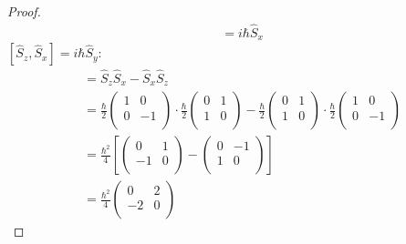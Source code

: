 \documentclass[../psets.tex]{subfiles}
\begin{document}
\begin{enumerate}
\begin{enumerate}
\begin{proof}
\begin{align*}
                &= i\hbar\hat{S}_x
            \end{align*}
            \underline{$[\hat{S}_z,\hat{S}_x]=i\hbar\hat{S}_y$}:
            \begin{align*}
                [\hat{S}_z,\hat{S}_x] &= \hat{S}_z\hat{S}_x-\hat{S}_x\hat{S}_z\\
                &= \frac{\hbar}{2}
                \begin{pmatrix}
                    1 & 0\\
                    0 & -1\\
                \end{pmatrix}
                \cdot\frac{\hbar}{2}
                \begin{pmatrix}
                    0 & 1\\
                    1 & 0\\
                \end{pmatrix}
                -\frac{\hbar}{2}
                \begin{pmatrix}
                    0 & 1\\
                    1 & 0\\
                \end{pmatrix}
                \cdot\frac{\hbar}{2}
                \begin{pmatrix}
                    1 & 0\\
                    0 & -1\\
                \end{pmatrix}\\
                &= \frac{\hbar^2}{4}\left[
                    \begin{pmatrix}
                        0 & 1\\
                        -1 & 0\\
                    \end{pmatrix}
                    -
                    \begin{pmatrix}
                        0 & -1\\
                        1 & 0\\
                    \end{pmatrix}
                \right]\\
                &= \frac{\hbar^2}{4}
                \begin{pmatrix}
                    0 & 2\\
                    -2 & 0\\

\end{pmatrix}
\end{align*}
\end{proof}
\end{enumerate}
\end{enumerate}
\end{document}
